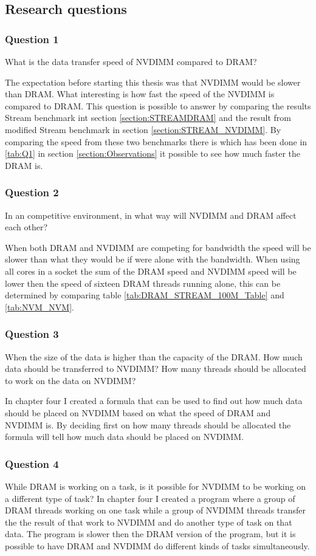 \documentclass[12pt,a4paper,USenglish]{article}      %
\begin{document}
\subsection{Research questions}
\subsubsection{Question 1}
What is the data transfer speed of NVDIMM compared to DRAM?

The expectation before starting this thesis was that NVDIMM would be slower than DRAM. What interesting is how fast the speed of the NVDIMM is compared to DRAM. This question is possible to answer by comparing the results Stream  benchmark int section \ref{section:STREAMDRAM} and the result from modified Stream benchmark in section \ref{section:STREAM_NVDIMM}. By comparing the speed from these two benchmarks there is which has been done in \ref{tab:Q1} in section \ref{section:Observations} it possible to see how much faster the DRAM is.

\subsubsection{Question 2}
In an competitive environment, in what way will NVDIMM and DRAM affect each other?

When both DRAM and NVDIMM are competing for bandwidth the speed will be slower than what they would be if were alone with the bandwidth. When using all cores in a socket the sum of the DRAM speed and NVDIMM speed will be lower then the speed of sixteen DRAM threads running alone, this can be determined by comparing table \ref{tab:DRAM_STREAM_100M_Table} and \ref{tab:NVM_NVM}.

\subsubsection{Question 3}
When the size of the data is higher than the capacity of the DRAM. How much data should be transferred to NVDIMM? How many threads should be allocated to work on the data on NVDIMM?

In chapter four I created a formula that can be used to find out how much data should be placed on NVDIMM based on what the speed of DRAM and NVDIMM is. By deciding first on how many threads should be allocated the formula will tell how much data should be placed on NVDIMM.

\subsubsection{Question 4}
While DRAM is working on a task, is it possible for NVDIMM to be working on a different type of task?
In chapter four I created a program where a group of DRAM threads working on one task while a group of NVDIMM threads transfer the the result of that work to NVDIMM and do another type of task on that data. The program is slower then the DRAM version of the program, but it is possible to have DRAM and NVDIMM do different kinds of tasks simultaneously.
\end{document}
